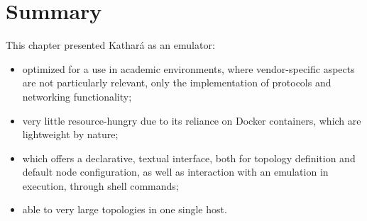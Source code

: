 \section{Summary}
\label{sec:katharasummary}

This chapter presented Kathará as an emulator:
\begin{itemize}
  \item optimized for a use in academic environments, where vendor-specific aspects are not particularly relevant, only the implementation of protocols and networking functionality;
  \item very little resource-hungry due to its reliance on Docker containers, which are lightweight by nature;
  \item which offers a declarative, textual interface, both for topology definition and default node configuration, as well as interaction with an emulation in execution, through shell commands;
  \item able to very large topologies in one single host.
\end{itemize}

